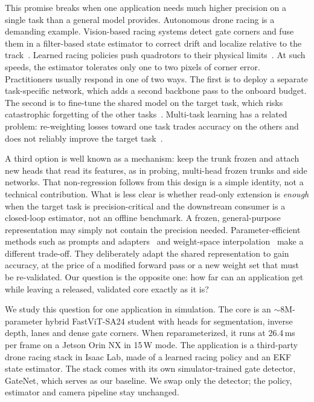 \documentclass[10pt,twocolumn,letterpaper]{article}
\begin{document}
This promise breaks when one application needs much higher precision on a single task than a general model provides. Autonomous drone racing is a demanding example. Vision-based racing systems detect gate corners and fuse them in a filter-based state estimator to correct drift and localize relative to the track~\cite{Foehn2020AlphapilotAutonomous}. Learned racing policies push quadrotors to their physical limits~\cite{Song2023ReachingLimit}. At such speeds, the estimator tolerates only one to two pixels of corner error. Practitioners usually respond in one of two ways. The first is to deploy a separate task-specific network, which adds a second backbone pass to the onboard budget. The second is to fine-tune the shared model on the target task, which risks catastrophic forgetting of the other tasks~\cite{Kirkpatrick2016OvercomingCatastrophic,Wang2023ComprehensiveSurvey}. Multi-task learning has a related problem: re-weighting losses toward one task trades accuracy on the others and does not reliably improve the target task~\cite{Xin2022DoCurrent,Lin2023DualbalancingMultitask}.

A third option is well known as a mechanism: keep the trunk frozen and attach new heads that read its features, as in probing, multi-head frozen trunks and side networks. That non-regression follows from this design is a simple identity, not a technical contribution. What is less clear is whether read-only extension is \emph{enough} when the target task is precision-critical and the downstream consumer is a closed-loop estimator, not an offline benchmark. A frozen, general-purpose representation may simply not contain the precision needed. Parameter-efficient methods such as prompts and adapters~\cite{Jia2022VisualPrompt,Chen2022AdaptformerAdapting,Chen2022VisionTransformer} and weight-space interpolation~\cite{Wortsman2021RobustFinetuning} make a different trade-off. They deliberately adapt the shared representation to gain accuracy, at the price of a modified forward pass or a new weight set that must be re-validated. Our question is the opposite one: how far can an application get while leaving a released, validated core exactly as it is?

We study this question for one application in simulation. The core is an $\sim$8M-parameter hybrid FastViT-SA24 student with heads for segmentation, inverse depth, lanes and dense gate corners. When reparameterized, it runs at 26.4\,ms per frame on a Jetson Orin NX in 15\,W mode. The application is a third-party drone racing stack in Isaac Lab, made of a learned racing policy and an EKF state estimator. The stack comes with its own simulator-trained gate detector, GateNet, which serves as our baseline. We swap only the detector; the policy, estimator and camera pipeline stay unchanged.
\end{document}
